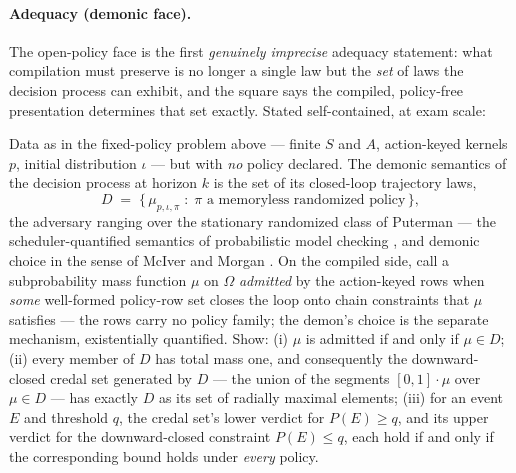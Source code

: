 \paragraph{Adequacy (demonic face).} The open-policy face is the
first \emph{genuinely imprecise} adequacy statement: what compilation
must preserve is no longer a single law but the \emph{set} of laws the
decision process can exhibit, and the square says the compiled,
policy-free presentation determines that set exactly.  Stated
self-contained, at exam scale:

\begin{problem}
\label{prob:mt-mdp-demonic}
Data as in the fixed-policy problem above --- finite
$S$ and $A$, action-keyed kernels $p$, initial distribution $\iota$
--- but with \emph{no} policy declared.  The demonic semantics of the
decision process at horizon $k$ is the set of its closed-loop
trajectory laws,
\[
  D \;=\; \bigl\{\, \mu_{p,\iota,\pi} \;:\; \pi \text{ a memoryless
  randomized policy} \,\bigr\},
\]
the adversary ranging over the stationary randomized class of Puterman
\cite{puterman-1994} --- the scheduler-quantified semantics of
probabilistic model checking \cite{baier-katoen-2008}, and demonic
choice in the sense of McIver and Morgan \cite{mciver-morgan-2005}.
On the compiled side, call a subprobability mass function $\mu$ on
$\Omega$ \emph{admitted} by the action-keyed rows when \emph{some}
well-formed policy-row set closes the loop onto chain constraints that
$\mu$ satisfies --- the rows carry no policy family; the demon's
choice is the separate mechanism, existentially quantified.  Show:
(i) $\mu$ is admitted if and only if $\mu \in D$; (ii) every member of
$D$ has total mass one, and consequently the downward-closed credal
set generated by $D$ --- the union of the segments $[0,1] \cdot \mu$
over $\mu \in D$ --- has exactly $D$ as its set of radially maximal
elements; (iii) for an event $E$ and threshold $q$, the credal set's
lower verdict for $P(E) \ge q$, and its upper verdict for the
downward-closed constraint $P(E) \le q$, each hold if and only if the
corresponding bound holds under \emph{every} policy.
\end{problem}

